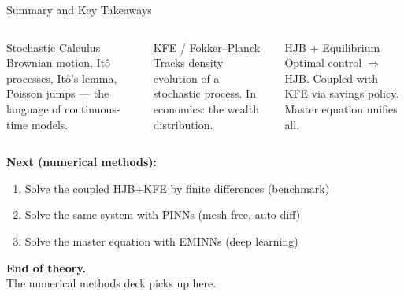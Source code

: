 \documentclass[aspectratio=169,11pt]{beamer}
\newcommand{\emphc}[1]{\textcolor{harvardcrimson}{#1}}
\begin{document}
\begin{frame}{Summary and Key Takeaways}
\begin{columns}[T]
\begin{block}{Stochastic Calculus}
\centering\small
\vspace{0.2em}
Brownian motion, It\^o processes, It\^o's lemma, Poisson jumps --- the \emphc{language} of continuous-time models.
\vspace{0.2em}
\end{block}

\begin{block}{KFE / Fokker--Planck}
\centering\small
\vspace{0.2em}
Tracks \emphc{density evolution} of a stochastic process. In economics: the wealth distribution.
\vspace{0.2em}
\end{block}

\begin{block}{HJB + Equilibrium}
\centering\small
\vspace{0.2em}
Optimal control $\Rightarrow$ HJB. Coupled with KFE via savings policy. Master equation unifies all.
\vspace{0.2em}
\end{block}
\end{columns}

\vspace{0.3em}
\textbf{Next (numerical methods):}
\begin{enumerate}\itemsep1pt
    \item Solve the coupled HJB+KFE by \emphc{finite differences} (benchmark)
    \item Solve the same system with \emphc{PINNs} (mesh-free, auto-diff)
    \item Solve the \emphc{master equation} with EMINNs (deep learning)
\end{enumerate}

\vspace{0.2em}
\begin{center}
\colorbox{uzhgreylight}{\parbox{0.6\textwidth}{\centering\small
\textbf{End of theory.}\\
The numerical methods deck picks up here.}}
\end{center}
\end{frame}
\end{document}
